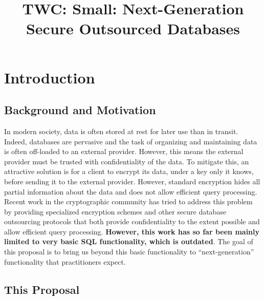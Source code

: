 \documentclass[11pt]{article}
\title{{{\Large{TWC: Small:  Next-Generation Secure Outsourced Databases}}}}
\date{}
\theoremstyle{remark}
\begin{document}
\maketitle
\vspace{-20mm}

\section{Introduction}

\subsection{Background and Motivation} 

In modern society, data is often stored at rest for later use than in transit.  Indeed, databases are pervasive and the task of organizing and maintaining data is often off-loaded to an external provider. However, this means the external provider must be trusted with confidentiality of the data.  To mitigate this, an attractive solution is for a client to encrypt its data, under a key only it knows, before sending it to the external provider.  However, standard encryption hides all partial information about the data and does not allow efficient query processing.  Recent work in the cryptographic community has tried to address this problem by providing specialized encryption schemes and other secure database outsourcing protocols that both provide confidentiality to the extent possible and allow efficient query processing.  \textbf{However, this work has so far been mainly limited to very basic SQL functionality, which is outdated}.  The goal of this proposal is to bring us beyond this basic functionality to ``next-generation'' functionality that  practitioners expect.  

\subsection{This Proposal} \label{subsec-prop}
\end{document}
